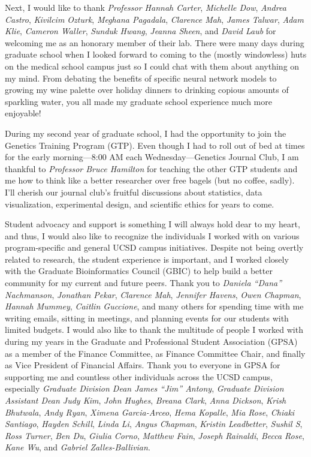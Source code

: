 \documentclass[11pt]{formatting-template}
\begin{document}
\begin{acknowledgements}
	Next, I would like to thank \textit{Professor Hannah Carter}, \textit{Michelle Dow}, \textit{Andrea Castro}, \textit{Kivilcim Ozturk}, \textit{Meghana Pagadala}, \textit{Clarence Mah}, \textit{James Talwar}, \textit{Adam Klie}, \textit{Cameron Waller}, \textit{Sunduk Hwang}, \textit{Jeanna Sheen}, and \textit{David Laub} for welcoming me as an honorary member of their lab. There were many days during graduate school when I looked forward to coming to the (mostly windowless) huts on the medical school campus just so I could chat with them about anything on my mind. From debating the benefits of specific neural network models to growing my wine palette over holiday dinners to drinking copious amounts of sparkling water, you all made my graduate school experience much more enjoyable!  
	
	During my second year of graduate school, I had the opportunity to join the Genetics Training Program (GTP). Even though I had to roll out of bed at times for the early morning—8:00 AM each Wednesday—Genetics Journal Club, I am thankful to \textit{Professor Bruce Hamilton} for teaching the other GTP students and me how to think like a better researcher over free bagels (but no coffee, sadly). I'll cherish our journal club's fruitful discussions about statistics, data visualization, experimental design, and scientific ethics for years to come.
	
	Student advocacy and support is something I will always hold dear to my heart, and thus, I would also like to recognize the individuals I worked with on various program-specific and general UCSD campus initiatives. Despite not being overtly related to research, the student experience is important, and I worked closely with the Graduate Bioinformatics Council (GBIC) to help build a better community for my current and future peers. Thank you to \textit{Daniela “Dana” Nachmanson}, \textit{Jonathan Pekar}, \textit{Clarence Mah}, \textit{Jennifer Havens}, \textit{Owen Chapman}, \textit{Hannah Mummey}, \textit{Caitlin Guccione}, and many others for spending time with me writing emails, sitting in meetings, and planning events for our students with limited budgets. I would also like to thank the multitude of people I worked with during my years in the Graduate and Professional Student Association (GPSA) as a member of the Finance Committee, as Finance Committee Chair, and finally as Vice President of Financial Affairs. Thank you to everyone in GPSA for supporting me and countless other individuals across the UCSD campus, especially \textit{Graduate Division Dean James “Jim” Antony}, \textit{Graduate Division Assistant Dean Judy Kim}, \textit{John Hughes}, \textit{Breana Clark}, \textit{Anna Dickson}, \textit{Krish Bhutwala}, \textit{Andy Ryan}, \textit{Ximena Garcia-Arceo}, \textit{Hema Kopalle}, \textit{Mia Rose}, \textit{Chiaki Santiago}, \textit{Hayden Schill}, \textit{Linda Li}, \textit{Angus Chapman}, \textit{Kristin Leadbetter}, \textit{Sushil S}, \textit{Ross Turner}, \textit{Ben Du}, \textit{Giulia Corno}, \textit{Matthew Fain}, \textit{Joseph Rainaldi}, \textit{Becca Rose}, \textit{Kane Wu}, and \textit{Gabriel Zalles-Ballivian}. 
	

\end{acknowledgements}
\end{document}
